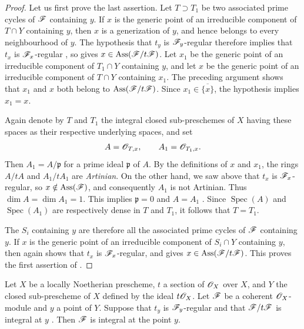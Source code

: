 \begin{proof}
Let us first prove the last assertion.
Let $T\supset T_1$ be two associated prime cycles of $\mathscr{F}$ containing $y$.
If $x$ is the generic point of an irreducible component of $T\cap Y$ containing $y$, then $x$ is a generization of $y$, and hence belongs to every neighbourhood of $y$.
The hypothesis that $t_y$ is $\mathscr{F}_y$-regular therefore implies that $t_x$ is $\mathscr{F}_x$-regular , so  gives $x\in\operatorname{Ass}(\mathscr{F}/t\mathscr{F})$.
Let $x_1$ be the generic point of an irreducible component of $T_1\cap Y$ containing $y$, and let $x$ be the generic point of an irreducible component of $T\cap Y$ containing $x_1$.
The preceding argument shows that $x_1$ and $x$ both belong to $\operatorname{Ass}(\mathscr{F}/t\mathscr{F})$.
Since $x_1\in\overline{\{x\}}$, the hypothesis implies $x_1=x$.

Again denote by $T$ and $T_1$ the integral closed sub-preschemes of $X$ having these spaces as their respective underlying spaces, and set
\[
A=\mathscr{O}_{T,x},
\qquad
A_1=\mathscr{O}_{T_1,x}.
\]
Then $A_1=A/\mathfrak p$ for a prime ideal $\mathfrak p$ of $A$.
By the definitions of $x$ and $x_1$, the rings $A/tA$ and $A_1/tA_1$ are \emph{Artinian}.
On the other hand, we saw above that $t_x$ is $\mathscr{F}_x$-regular, so $x\notin\operatorname{Ass}(\mathscr{F})$, and consequently $A_1$ is not Artinian.
Thus $\dim A=\dim A_1=1$.
This implies $\mathfrak p=0$ and $A=A_1$ .
Since $\operatorname{Spec}(A)$ and $\operatorname{Spec}(A_1)$ are respectively dense in $T$ and $T_1$, it follows that $T=T_1$.

The $S_i$ containing $y$ are therefore all the associated prime cycles of $\mathscr{F}$ containing $y$.
If $x$ is the generic point of an irreducible component of $S_i\cap Y$ containing $y$, then  again shows that $t_x$ is $\mathscr{F}_x$-regular, and  gives $x\in\operatorname{Ass}(\mathscr{F}/t\mathscr{F})$.
This proves the first assertion of .
\end{proof}

\begin{proposition}[3.4.5]
\label{IV.3.4.5}
Let $X$ be a locally Noetherian prescheme, $t$ a section of $\mathscr{O}_X$ over $X$, and $Y$ the closed sub-prescheme of $X$ defined by the ideal $t\mathscr{O}_X$.
Let $\mathscr{F}$ be a coherent $\mathscr{O}_X$-module and $y$ a point of $Y$.
Suppose that $t_y$ is $\mathscr{F}_y$-regular and that $\mathscr{F}/t\mathscr{F}$ is integral at $y$ .
Then $\mathscr{F}$ is integral at the point $y$.
\end{proposition}

